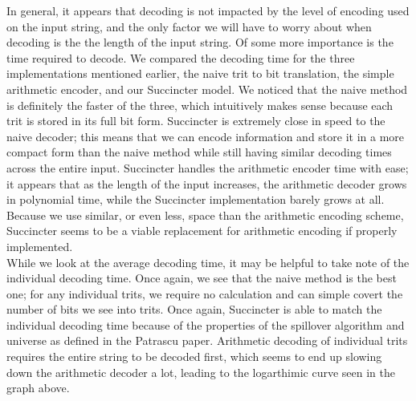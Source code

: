\documentclass{article}
\begin{document}
In general, it appears that decoding is not impacted by the level of encoding used on the input string, and the only factor we will have to worry about when decoding is the the length of the input string. Of some more importance is the time required to decode. We compared the decoding time for the three implementations mentioned earlier, the naive trit to bit translation, the simple arithmetic encoder, and our Succincter model. We noticed that the naive method is definitely the faster of the three, which intuitively makes sense because each trit is stored in its full bit form. Succincter is extremely close in speed to the naive decoder; this means that we can encode information and store it in a more compact form than the naive method while still having similar decoding times across the entire input. Succincter handles the arithmetic encoder time with ease; it appears that as the length of the input increases, the arithmetic decoder grows in polynomial time, while the Succincter implementation barely grows at all. Because we use similar, or even less, space than the arithmetic encoding scheme, Succincter seems to be a viable replacement for arithmetic encoding if properly implemented. \\
\indent While we look at the average decoding time, it may be helpful to take note of the individual decoding time. Once again, we see that the naive method is the best one; for any individual trits, we require no calculation and can simple covert the number of bits we see into trits. Once again, Succincter is able to match the individual decoding time because of the properties of the spillover algorithm and universe as defined in the Patrascu paper. Arithmetic decoding of individual trits requires the entire string to be decoded first, which seems to end up slowing down the arithmetic decoder a lot, leading to the logarthimic curve seen in the graph above.
\end{document}
